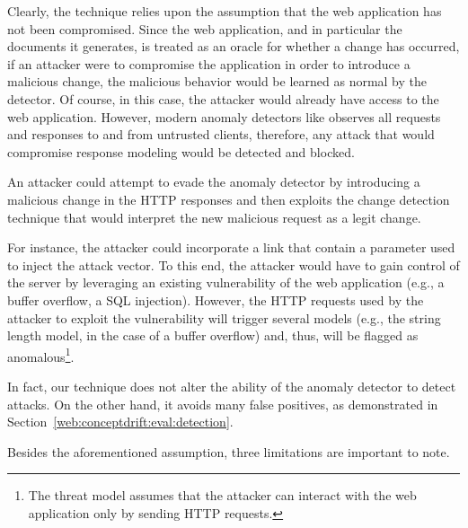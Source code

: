 \noindent Clearly, the technique relies upon the assumption that the web application has not been compromised.  Since the web application, and in particular the documents it generates, is treated as an oracle for whether a change has occurred, if an attacker were to compromise the application in order to introduce a malicious change, the malicious behavior would be learned as normal by the detector.  Of course, in this case, the attacker would already have access to the web application. However, modern anomaly detectors like \webanomaly observes all requests and responses to and from untrusted clients, therefore, any attack that would compromise response modeling would be detected and blocked.

\begin{example}
  An attacker could attempt to evade the anomaly detector by introducing a malicious change in the \ac{HTTP} responses and then exploits the change detection technique that would interpret the new malicious request as a legit change.

For instance, the attacker could incorporate a link that contain a parameter used to inject the attack vector. To this end, the attacker would have to gain control of the server by leveraging an existing vulnerability of the web application (e.g., a buffer overflow, a \ac{SQL} injection). However, the \ac{HTTP} requests used by the attacker to exploit the vulnerability will trigger several models (e.g., the string length model, in the case of a buffer overflow) and, thus, will be flagged as anomalous\footnote{The threat model assumes that the attacker can interact with the web application only by sending \ac{HTTP} requests.}.
\end{example}

In fact, our technique does not alter the ability of the anomaly detector to detect attacks. On the other hand, it avoids many false positives, as demonstrated in Section~\ref{web:conceptdrift:eval:detection}.

Besides the aforementioned assumption, three limitations are important to note.


